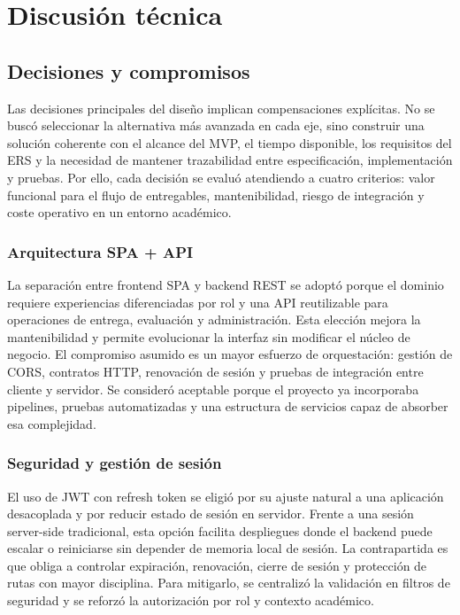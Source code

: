 \FloatBarrier
\section{Discusi\'on t\'ecnica}

\subsection{Decisiones y compromisos}

Las decisiones principales del dise\~no implican compensaciones expl\'icitas. No se busc\'o seleccionar la alternativa m\'as avanzada en cada eje, sino construir una soluci\'on coherente con el alcance del MVP, el tiempo disponible, los requisitos del ERS y la necesidad de mantener trazabilidad entre especificaci\'on, implementaci\'on y pruebas. Por ello, cada decisi\'on se evalu\'o atendiendo a cuatro criterios: valor funcional para el flujo de entregables, mantenibilidad, riesgo de integraci\'on y coste operativo en un entorno acad\'emico.

\subsubsection*{Arquitectura SPA + API}

La separaci\'on entre frontend SPA y backend REST se adopt\'o porque el dominio requiere experiencias diferenciadas por rol y una API reutilizable para operaciones de entrega, evaluaci\'on y administraci\'on. Esta elecci\'on mejora la mantenibilidad y permite evolucionar la interfaz sin modificar el n\'ucleo de negocio. El compromiso asumido es un mayor esfuerzo de orquestaci\'on: gesti\'on de CORS, contratos HTTP, renovaci\'on de sesi\'on y pruebas de integraci\'on entre cliente y servidor. Se consider\'o aceptable porque el proyecto ya incorporaba pipelines, pruebas automatizadas y una estructura de servicios capaz de absorber esa complejidad.

\subsubsection*{Seguridad y gesti\'on de sesi\'on}

El uso de JWT con refresh token se eligi\'o por su ajuste natural a una aplicaci\'on desacoplada y por reducir estado de sesi\'on en servidor. Frente a una sesi\'on server-side tradicional, esta opci\'on facilita despliegues donde el backend puede escalar o reiniciarse sin depender de memoria local de sesi\'on. La contrapartida es que obliga a controlar expiraci\'on, renovaci\'on, cierre de sesi\'on y protecci\'on de rutas con mayor disciplina. Para mitigarlo, se centraliz\'o la validaci\'on en filtros de seguridad y se reforz\'o la autorizaci\'on por rol y contexto acad\'emico.

